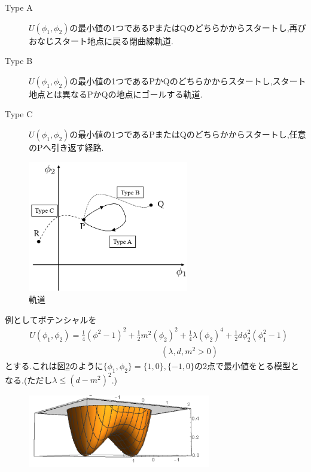 \documentclass[dvipdfmx,11pt,a4paper]{jsbook}
\begin{document}
\begin{description}
    \item[Type A] $U(\phi_1,\phi_2)$の最小値の1つであるPまたはQのどちらかからスタートし,再びおなじスタート地点に戻る閉曲線軌道.
    \item[Type B] $U(\phi_1,\phi_2)$の最小値の1つであるPかQのどちらかからスタートし,スタート地点とは異なるPかQの地点にゴールする軌道.
    \item[Type C] $U(\phi_1,\phi_2)$の最小値の1つであるPまたはQのどちらかからスタートし,任意のPへ引き返す経路.
\end{description}

\begin{figure}[H]
    \centering
    \includegraphics[width=7cm]{figure/orbit1.png}
    \caption{軌道}
    \label{orbit1}
\end{figure}

例としてポテンシャルを
\begin{align}
     & U\left(\phi_{1}, \phi_{2}\right)=\frac{1}{4}\left(\phi^{2}-1\right)^{2}+\frac{1}{2} m^{2}\left(\phi_{2}\right)^{2}+\frac{1}{4} \lambda\left(\phi_{2}\right)^{4}+\frac{1}{2} d \phi_{2}^{2}\left(\phi_{1}^{2}-1\right)\label{eq:2.42} \\
     & \qquad \ \ \ \ \ \ \ \ \ \ \ \ \ \ \ \ \ \ \ \ \ \ \ \ \ \ \ \ \ \ \ \ \ \ \ \ \ \ \ \ \ \ \ \ \ \ \ \ \ \ \ \ \ \ \ \ \ \ \ \ \ \ (\lambda, d, m^2 >0)\nonumber
\end{align}
とする.これは図\ref{phi4_model}のように$\{\phi_1,\phi_2\}=\{1,0\},\{-1,0\}$の2点で最小値をとる模型となる.(ただし$\lambda \leq (d-m^2)^2$.)

\begin{figure}[H]
    \centering
    \includegraphics[width=8cm]{figure/phi4_model.png}
    \caption{}
    \label{phi4_model}
\end{figure}
\end{document}
